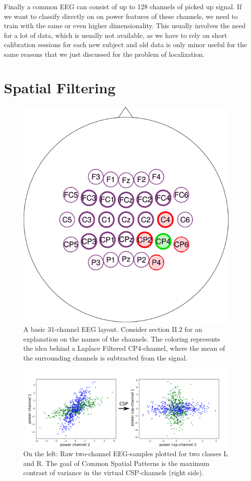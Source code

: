 \documentclass[12pt,twoside,twocolumn]{article}
\begin{document}
Finally a common EEG can consist of up to 128 channels of picked up signal. If we want to classify directly on on power features of these channels, we need to train with the same or even higher dimensionality. This usually involves the need for a lot of data, which is usually not available, as we have to rely on short calibration sessions for each new subject and old data is only minor useful for the same reasons that we just discussed for the problem of localization.

\section{Spatial Filtering}
\begin{figure}
\centering
\includegraphics[scale=0.30]{lfilter3.png}
\caption{A basic 31-channel EEG layout. Consider section II.2 for an explanation on the names of the channels. The coloring represents the idea behind a Laplace Filtered CP4-channel, where the mean of the surrounding channels is subtracted from the signal.}
\end{figure}

\begin{figure}
\centering
\includegraphics[scale=0.34]{scattered.png}
\caption{On the left: Raw two-channel EEG-samples plotted for two classes L and R. The goal of Common Spatial Patterns is the maximum contrast of variance in the virtual CSP-channels (right side).}
\end{figure}
\end{document}
